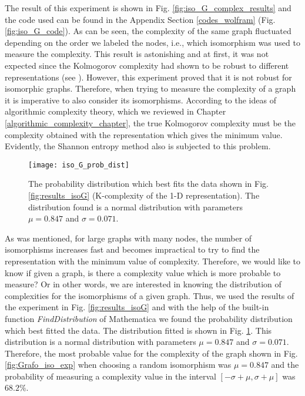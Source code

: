 The result of this experiment is shown in Fig. \ref{fig:iso_G_complex_results} and the code used can be found in the Appendix Section \ref{codes_wolfram} (Fig. \ref{fig:iso_G_code}). As can be seen, the complexity of the same graph fluctuated depending on the order we labeled the nodes, i.e., which isomorphism was used to measure the complexity. This result is astonishing and at first, it was not expected since the Kolmogorov complexity had shown to be robust to different representations (see \cite{kolmo_graph}). However, this experiment proved that it is not robust for isomorphic graphs. Therefore, when trying to measure the complexity of a graph it is imperative to also consider its isomorphisms. According to the ideas of algorithmic complexity theory, which we reviewed in Chapter \ref{algorithmic_complexity_chapter}, the true Kolmogorov complexity must be the complexity obtained with the representation which gives the minimum value. Evidently, the Shannon entropy method also is subjected to this problem.\\

\begin{figure}
\centering
\texttt{[image: iso\_G\_prob\_dist]}
\caption[The distribution of complexities for the isomorphisms of a graph.]{The probability distribution which best fits the data shown in Fig. \ref{fig:results_isoG} (K-complexity of the 1-D representation). The distribution found is a normal distribution with parameters $\mu =0.847$ and $\sigma =0.071$.}
\label{fig:iso_G_prob_dist}
\end{figure}

As was mentioned, for large graphs with many nodes, the number of isomorphisms increases fast and becomes impractical to try to find the representation with the minimum value of complexity. Therefore, we would like to know if given a graph, is there a complexity value which is more probable to measure? Or in other words, we are interested in knowing the distribution of complexities for the isomorphisms of a given graph. Thus, we used the results of the experiment in Fig. \ref{fig:results_isoG} and with the help of the built-in function \textit{FindDistribution} of Mathematica we found the probability distribution which best fitted the data. The distribution fitted is shown in Fig. \ref{fig:iso_G_prob_dist}. This distribution is a normal distribution with parameters $\mu =0.847$ and $\sigma =0.071$. Therefore, the most probable value for the complexity of the graph shown in Fig. \ref{fig:Grafo_iso_exp} when choosing a random isomorphism was $\mu =0.847$ and the probability of measuring a complexity value in the interval $[- \sigma + \mu , \sigma + \mu]$ was $68.2 \%$.\\

